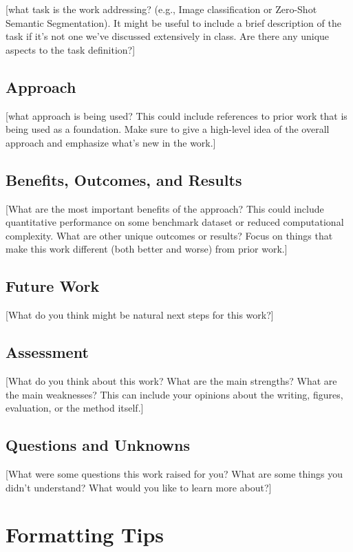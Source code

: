 \documentclass[10pt,twocolumn,letterpaper]{article}
\begin{document}
[what task is the work addressing? (e.g., Image classification or Zero-Shot Semantic Segmentation). It might be useful to include a brief description of the task if it's not one we've discussed extensively in class. Are there any unique aspects to the task definition?]

\subsection{Approach}

[what approach is being used? This could include references to prior work that is being used as a foundation. Make sure to give a high-level idea of the overall approach and emphasize what's new in the work.]

\subsection{Benefits, Outcomes, and Results}

[What are the most important benefits of the approach? This could include quantitative performance on some benchmark dataset or reduced computational complexity. What are other unique outcomes or results? Focus on things that make this work different (both better and worse) from prior work.] 

\subsection{Future Work}

[What do you think might be natural next steps for this work?]

\subsection{Assessment}

[What do you think about this work? What are the main strengths? What are the main weaknesses? This can include your opinions about the writing, figures, evaluation, or the method itself.]

\subsection{Questions and Unknowns}

[What were some questions this work raised for you? What are some things you didn't understand? What would you like to learn more about?]

\section{Formatting Tips}
\label{sec:formatting}
\end{document}

